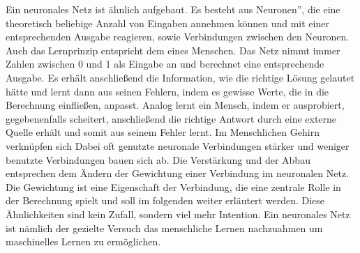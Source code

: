 \documentclass{article}
\begin{document}
Ein neuronales Netz ist ähnlich aufgebaut. Es besteht aus \glqq Neuronen'', die eine theoretisch beliebige Anzahl von Eingaben annehmen können und mit einer entsprechenden Ausgabe reagieren, sowie Verbindungen zwischen den Neuronen. Auch das Lernprinzip entspricht dem eines Menschen. Das Netz nimmt immer Zahlen zwischen 0 und 1 als Eingabe an und berechnet eine entsprechende Ausgabe. Es erhält anschließend die Information, wie die richtige Lösung gelautet hätte und lernt dann aus seinen Fehlern, indem es gewisse Werte, die in die Berechnung einfließen, anpasst. Analog lernt ein Mensch, indem er ausprobiert, gegebenenfalls scheitert, anschließend die richtige Antwort durch eine externe Quelle erhält und somit aus seinem Fehler lernt. Im Menschlichen Gehirn verknüpfen sich Dabei oft genutzte neuronale Verbindungen stärker und weniger benutzte Verbindungen bauen sich ab\cite{2}. Die Verstärkung und der Abbau entsprechen dem Ändern der Gewichtung einer Verbindung im neuronalen Netz. Die Gewichtung ist eine Eigenschaft der Verbindung, die eine zentrale Rolle in der Berechnung spielt und soll im folgenden weiter erläutert werden. Diese Ähnlichkeiten sind kein Zufall, sondern viel mehr Intention. Ein neuronales Netz ist nämlich der gezielte Versuch das menschliche Lernen nachzuahmen um maschinelles Lernen zu ermöglichen.
\end{document}
